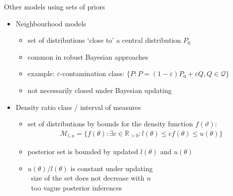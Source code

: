 \documentclass{beamer}
\newcommand{\reals}{\mathbb{R}}
\newcommand{\posreals}{\reals_{>0}}
\def\play{{\structure{$\blacktriangleright$}}}
\begin{document}


\begin{frame}[label=othermodels-app]{Other models using sets of priors
\hyperlink{othermodels-back<3>}{} \hyperlink{othermodels-back<10>}{}}
\begin{itemize}
\item Neighbourhood models
\begin{itemize}
\item set of distributions `close to' a central distribution $P_0$
\item common in robust Bayesian approaches 
\item example: $\varepsilon$-contamination class:
$\{ P : P = (1-\varepsilon) P_0 + \varepsilon Q, Q \in \mathcal{Q} \}$
\item not necessarily closed under Bayesian updating
\end{itemize}
\item Density ratio class / interval of measures 
\begin{itemize}
\item set of distributions by bounds for the density function $f(\vartheta)$:
\begin{align*}
\mathcal{M}_{l,u} = \big\{ f(\theta) :
\exists c \in \posreals: l(\theta) \le c f(\theta) \le u(\theta)\big\}
\end{align*}
\item posterior set is bounded by updated $l(\theta)$ and $u(\theta)$
\item $u(\theta)/l(\theta)$ is constant under updating\\
\quad\play\ size of the set does not decrease with $n$\\
\quad\play\ too vague posterior inferences
\end{itemize}
\end{itemize}
\end{frame}
\end{document}
